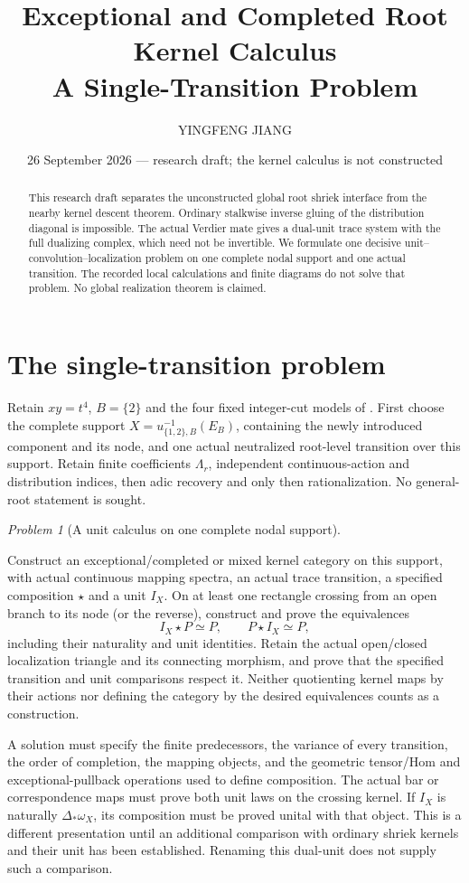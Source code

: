 \documentclass[11pt]{article}
\title{Exceptional and Completed Root Kernel Calculus\\
\large A Single-Transition Problem}
\author{YINGFENG JIANG}
\date{26 September 2026 --- research draft; the kernel calculus is not constructed}
\theoremstyle{definition}
\theoremstyle{remark}
\newtheorem{problem}[proposition]{Problem}
\begin{document}
\maketitle
\begin{abstract}
This research draft separates the unconstructed global root shriek
interface from the nearby kernel descent theorem.  Ordinary stalkwise
inverse gluing of the distribution diagonal is impossible.  The actual
Verdier mate gives a dual-unit trace system with the full dualizing
complex, which need not be invertible.  We formulate one decisive
unit--convolution--localization problem on one complete nodal support
and one actual transition.  The recorded local calculations and finite
diagrams do not solve that problem.  No global realization theorem is
claimed.
\end{abstract}

\section{The single-transition problem}
Retain $xy=t^4$, $B=\{2\}$ and the four fixed integer-cut models of
\cite{Nearby}.  First choose the complete support
$X=u_{\{1,2\},B}^{-1}(E_B)$, containing the newly introduced component
and its node, and one actual neutralized root-level transition over
this support.  Retain finite coefficients $\Lambda_r$, independent
continuous-action and distribution indices, then adic recovery and
only then rationalization.  No general-root statement is sought.

\begin{problem}[A unit calculus on one complete nodal support]
\label{problem:unit-calculus}
\leavevmode\par\noindent
Construct an exceptional/completed or mixed kernel category on this
support, with actual continuous mapping spectra, an actual trace
transition, a specified composition $\star$ and a unit $I_X$.
On at least one rectangle crossing from an open branch to its node
(or the reverse), construct and prove the equivalences
\[
 I_X\star P\simeq P,\qquad P\star I_X\simeq P,
\]
including their naturality and unit identities.  Retain the actual
open/closed localization triangle and its connecting morphism, and
prove that the specified transition and unit comparisons respect it.
Neither quotienting kernel maps by their actions nor defining the
category by the desired equivalences counts as a construction.
\end{problem}

A solution must specify the finite predecessors, the variance of every
transition, the order of completion, the mapping objects, and the
geometric tensor/Hom and exceptional-pullback operations used to define
composition.  The actual bar or correspondence maps must prove both
unit laws on the crossing kernel.  If $I_X$ is naturally
$\Delta_*\omega_X$, its composition must be proved unital with that
object.  This is a different presentation until an additional comparison
with ordinary shriek kernels and their unit has been established.
Renaming this dual-unit does not supply such a comparison.
\end{document}
